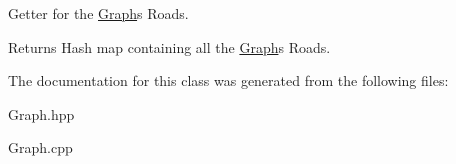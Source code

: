 Getter for the \hyperlink{class_graph}{Graph}\textquotesingle{}s Roads.

\begin{DoxyReturn}{Returns}
Hash map containing all the \hyperlink{class_graph}{Graph}\textquotesingle{}s Roads. 
\end{DoxyReturn}


The documentation for this class was generated from the following files\+:\begin{DoxyCompactItemize}
\item 
Graph.\+hpp\item 
Graph.\+cpp\end{DoxyCompactItemize}
